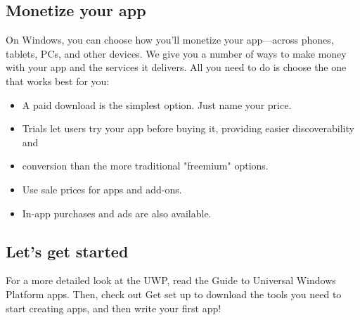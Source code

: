 \subsection{Monetize your app}
On Windows, you can choose how you'll monetize your app—across phones, tablets, PCs, and other devices. We give you a number of ways to make money with your app and the services it delivers. All you need to do is choose the one that works best for you:

\begin{itemize}
	\item A paid download is the simplest option. Just name your price.
\item Trials let users try your app before buying it, providing easier discoverability and \item conversion than the more traditional "freemium" options.
\item Use sale prices for apps and add-ons.
\item In-app purchases and ads are also available.
\end{itemize}

\subsection{Let's get started}
For a more detailed look at the UWP, read the Guide to Universal Windows Platform apps. Then, check out Get set up to download the tools you need to start creating apps, and then write your first app!